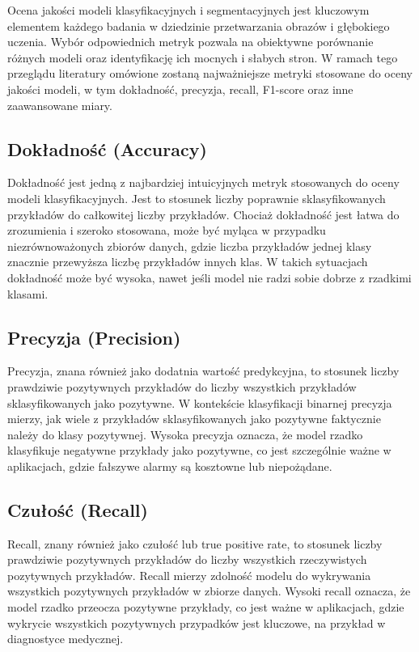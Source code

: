 Ocena jakości modeli klasyfikacyjnych i segmentacyjnych jest kluczowym elementem każdego badania w 
dziedzinie przetwarzania obrazów i głębokiego uczenia. Wybór odpowiednich metryk pozwala na obiektywne 
porównanie różnych modeli oraz identyfikację ich mocnych i słabych stron. W ramach tego przeglądu 
literatury omówione zostaną najważniejsze metryki stosowane do oceny jakości modeli, w tym dokładność, 
precyzja, recall, F1-score oraz inne zaawansowane miary.

\subsection*{Dokładność (Accuracy)}

Dokładność jest jedną z najbardziej intuicyjnych metryk stosowanych do oceny modeli klasyfikacyjnych. 
Jest to stosunek liczby poprawnie sklasyfikowanych przykładów do całkowitej liczby przykładów. 
Chociaż dokładność jest łatwa do zrozumienia i szeroko stosowana, może być myląca w przypadku 
niezrównoważonych zbiorów danych, gdzie liczba przykładów jednej klasy znacznie przewyższa liczbę 
przykładów innych klas. W takich sytuacjach dokładność może być wysoka, nawet jeśli model nie radzi 
sobie dobrze z rzadkimi klasami.

\subsection*{Precyzja (Precision)}

Precyzja, znana również jako dodatnia wartość predykcyjna, to stosunek liczby prawdziwie pozytywnych 
przykładów do liczby wszystkich przykładów sklasyfikowanych jako pozytywne. W kontekście klasyfikacji 
binarnej precyzja mierzy, jak wiele z przykładów sklasyfikowanych jako pozytywne faktycznie należy do 
klasy pozytywnej. Wysoka precyzja oznacza, że model rzadko klasyfikuje negatywne przykłady jako 
pozytywne, co jest szczególnie ważne w aplikacjach, gdzie fałszywe alarmy są kosztowne lub niepożądane.

\subsection*{Czułość (Recall)}

Recall, znany również jako czułość lub true positive rate, to stosunek liczby prawdziwie pozytywnych 
przykładów do liczby wszystkich rzeczywistych pozytywnych przykładów. Recall mierzy zdolność modelu 
do wykrywania wszystkich pozytywnych przykładów w zbiorze danych. Wysoki recall oznacza, że model 
rzadko przeocza pozytywne przykłady, co jest ważne w aplikacjach, gdzie wykrycie wszystkich 
pozytywnych przypadków jest kluczowe, na przykład w diagnostyce medycznej.

